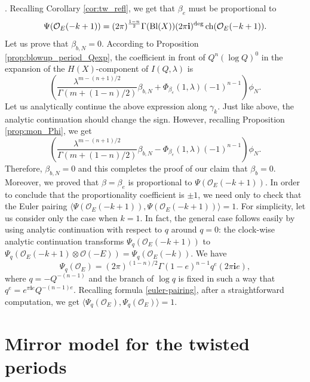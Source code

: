 \documentclass[pdftex]{sigma}
\numberwithin{equation}{section}
\newcommand{\leftexp}[2]{{\vphantom{#2}}^{#1}{#2}}
\newcommand{\ii}{\mathbf{i}}
\renewcommand{\O}{\mathcal{O}}
\begin{document}
\smash{$\leftexp{tw}{I}^{(-m)}_{-\beta_e}(1,\lambda)$}. Recalling Corollary \ref{cor:tw_refl}, we get that $\beta_e$ must be proportional to
\[
\Psi(\O_E(-k+1))=
(2\pi)^{\frac{1-n}{2}} \Gamma(\operatorname{Bl}(X)) (2\pi\ii)^{\rm deg}
\operatorname{ch}(\O_E(-k+1)).
\]
Let us prove that $\beta_{b,N}=0$.
According to Proposition \ref{prop:blowup_period_Qexp}, the coefficient in front of $Q^n (\log Q)^0$ in the expansion of the $H(X)$-component of $I(Q,\lambda)$ is
\[
\left( \frac{\lambda^{m-(n+1)/2}}{\Gamma(m+(1-n)/2)} \beta_{b,N} +
\Phi_{\beta_e}(1,\lambda) (-1)^{n-1} \right) \phi_N.
\]
Let us analytically continue the above expression along $\gamma_k$. Just like above, the analytic continuation should change the sign. However, recalling Proposition \ref{prop:mon_Phi}, we get
\[
\left( \frac{\lambda^{m-(n+1)/2}}{\Gamma(m+(1-n)/2)} \beta_{b,N} -
\Phi_{\beta_e}(1,\lambda) (-1)^{n-1} \right) \phi_N.
\]
Therefore, $\beta_{b,N}=0$ and this completes the proof of our claim that $\beta_b=0$. Moreover, we proved that $\beta=\beta_e$ is proportional to $\Psi(\O_E(-k+1))$. In order to conclude that the proportionality coefficient is $\pm 1$, we need only to check that the Euler pairing
${\langle \Psi(\O_E(-k+1)), \Psi(\O_E(-k+1))\rangle =1}$. For simplicity, let us consider only the case when $k=1$. In fact, the general case follows easily by using analytic continuation with respect to $q$ around $q=0$: the clock-wise analytic continuation transforms $\Psi_q(\O_E(-k+1))$ to $\Psi_q(\O_E(-k+1)\otimes \O(-E))=\Psi_q(\O_E(-k))$. We have
\[
\Psi_q(\O_E)=
(2\pi)^{(1-n)/2}
\Gamma(1-e)^{n-1}
q^{e} (2\pi \ii e),
\]
where $q=-Q^{-(n-1)}$ and the branch of $\log q$ is fixed in such a way that $q^{e}= e^{\pi\ii e} Q^{-(n-1)e}$. Recalling formula \eqref{euler-pairing}, after a straightforward computation, we get $\langle\Psi_q(\O_E),\Psi_q(\O_E)\rangle=1$.

\section{Mirror model for the twisted periods}\label{sec:mirror}
\end{document}
